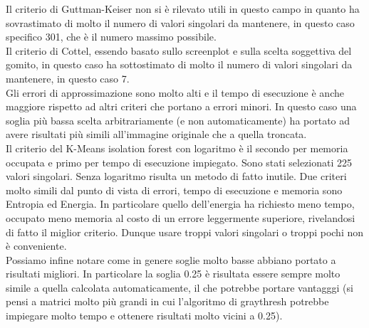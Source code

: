 \noindent Il criterio di Guttman-Keiser non si è rilevato utili in questo campo in quanto ha sovrastimato di molto il numero di valori singolari da mantenere, in questo caso specifico 301, che è il numero massimo possibile.\\
Il criterio di Cottel, essendo basato sullo screenplot e sulla scelta soggettiva del gomito, in questo caso ha sottostimato di molto il numero di valori singolari da mantenere, in questo caso 7.\\
Gli errori di approssimazione sono molto alti e il tempo di esecuzione è anche maggiore rispetto ad altri criteri che portano a errori minori. In questo caso una soglia più bassa scelta arbitrariamente (e non automaticamente) ha portato ad avere risultati più simili all'immagine originale che a quella troncata.\\
Il criterio del K-Means isolation forest con logaritmo è il secondo per memoria occupata e primo per tempo di esecuzione impiegato. Sono stati selezionati 225 valori singolari. Senza logaritmo risulta un metodo di fatto inutile.
Due criteri molto simili dal punto di vista di errori, tempo di esecuzione e memoria sono Entropia ed Energia. In particolare quello dell'energia ha richiesto meno tempo, occupato meno memoria al costo di un errore leggermente superiore, rivelandosi di fatto il miglior criterio. Dunque usare troppi valori singolari o troppi pochi non è conveniente.\\

\noindent Possiamo infine notare come in genere soglie molto basse abbiano portato a risultati migliori. In particolare la soglia 0.25 è risultata essere sempre molto simile a quella calcolata automaticamente, il che potrebbe portare vantagggi (si pensi a matrici molto più grandi in cui l'algoritmo di graythresh potrebbe impiegare molto tempo e ottenere risultati molto vicini a 0.25).\\
